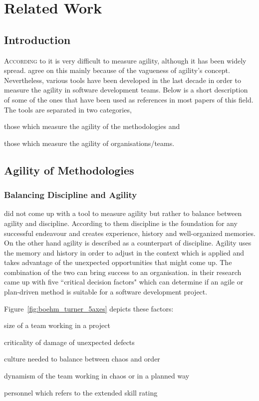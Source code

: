 \chapter{Related Work}\label{ch:related_work}

\section{Introduction}
\lettrine[lines=4, loversize=-0.1, lraise=0.1]{A}{ccording} to \citet{yauch} it is very difficult to measure agility, although it has been widely spread. \citet{tsourveloudis} agree on this mainly because of the vagueness of agility's concept. Nevertheless, various tools have been developed in the last decade in order to measure the agility in software development teams. Below is a short description of some of the ones that have been used as references in most papers of this field. The tools are separated in two categories, 
\begin{inparaenum} [a\upshape)]
\item those which measure the agility of the methodologies and
\item those which measure the agility of organisations/teams.
\end{inparaenum}

\section{Agility of Methodologies}

\subsection{Balancing Discipline and Agility}
\citet{1231450} did not come up with a tool to measure agility but rather to balance between agility and discipline. According to them \cite{1317503} discipline is the foundation for any successful endeavour and creates experience, history and well-organized memories. On the other hand agility is described as a counterpart of discipline. Agility uses the memory and history in order to adjust in the context which is applied and takes advantage of the unexpected opportunities that might come up. The combination of the two can bring success to an organisation. 
\citet{1231450} in their research came up with five ``critical decision factors" which can determine if an agile or plan-driven method is suitable for a software development project.

Figure~\ref{fig:boehm_turner_5axes} depicts these factors:
\begin{inparaenum} [a\upshape)]
\item size of a team working in a project
\item criticality of damage of unexpected defects
\item culture needed to balance between chaos and order
\item dynamism of the team working in chaos or in a planned way
\item personnel which refers to the extended \citet{cockburn2002agile} skill rating %
\end{inparaenum}

